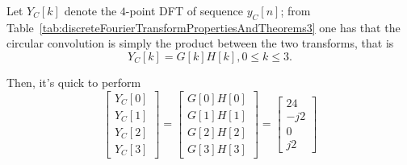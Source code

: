 \documentclass[\documentfontsize, twocolumn]{\classname}
\begin{document}
Let $Y_C[k]$ denote the $4$-point DFT of sequence $y_C[n]$; from Table~\ref{tab:discreteFourierTransformPropertiesAndTheorems3} one has that the circular convolution is simply the product between the two transforms, that is
\[
    Y_C[k] = G[k]H[k], 0 \leq k \leq 3.
\]

Then, it's quick to perform
\begin{equation*}
    \begin{bmatrix}
        Y_C[0] \\
        Y_C[1] \\
        Y_C[2] \\
        Y_C[3]
    \end{bmatrix}
    =
    \begin{bmatrix}
        G[0]H[0] \\
        G[1]H[1] \\
        G[2]H[2] \\
        G[3]H[3]
    \end{bmatrix}
    =
    \begin{bmatrix}
        24 \\
        -j2 \\
        0 \\
        j2
    \end{bmatrix}
\end{equation*}
\end{document}
